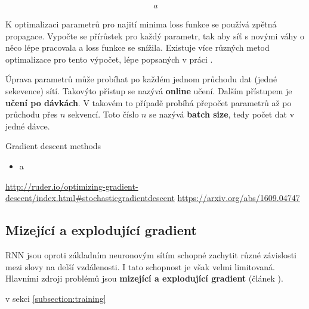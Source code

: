 \begin{align}\label{figure:loss}
  a
\end{align}

K optimalizaci parametrů pro najití minima loss funkce se používá zpětná propagace. Vypočte se přírůstek pro každý parametr, tak aby síť s novými váhy o něco lépe pracovala a loss funkce se snížila. Existuje více různých metod optimalizace pro tento výpočet, lépe popsaných v práci \cite{gradientDescent}.

Úprava parametrů může probíhat po každém jednom průchodu dat (jedné sekevence) sítí. Takovýto přístup se nazývá \textbf{online} učení. Dalším přístupem je \textbf{učení po dávkách}. V takovém to případě probíhá přepočet parametrů až po průchodu přes $n$ sekvencí. Toto číslo $n$ se nazývá \textbf{batch size}, tedy počet dat v jedné dávce.



Gradient descent methods
\begin{itemize}
  \item a
\end{itemize}

\url{http://ruder.io/optimizing-gradient-descent/index.html#stochasticgradientdescent}
\url{https://arxiv.org/abs/1609.04747}


\subsection{Mizející a explodující gradient} \label{subsection:gradient}
RNN jsou oproti základním neuronovým sítím schopné zachytit různé závislosti mezi slovy na delší vzdálenosti. I tato schopnost je však velmi limitovaná. Hlavními zdroji problémů jsou \textbf{mizející a explodující gradient} (článek \cite{gradientProblems}).

 v sekci \ref{subsection:training}

